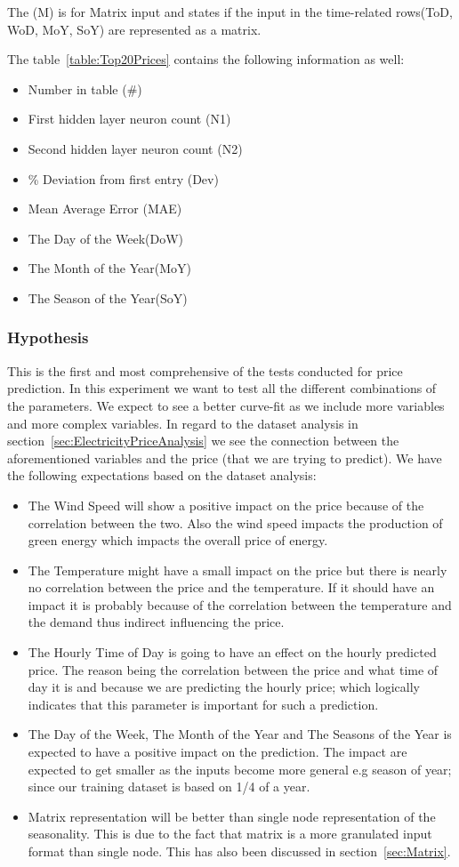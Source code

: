 The (M) is for Matrix input and states if the input in the time-related rows(ToD, WoD, MoY, SoY) are represented as a matrix.

The table~\ref{table:Top20Prices} contains the following information as well:
\begin{itemize}
	\item Number in table (\#)
	\item First hidden layer neuron count (N1)
	\item Second hidden layer neuron count (N2)
	\item \% Deviation from first entry (Dev)
	\item Mean Average Error (MAE)
	\item The Day of the Week(DoW)
	\item The Month of the Year(MoY)
	\item The Season of the Year(SoY)
\end{itemize}

\subsubsection{Hypothesis}
This is the first and most comprehensive of the tests conducted for price prediction. In this experiment we want to test all the different combinations of the parameters. We expect to see a better curve-fit as we include more variables and more complex variables. In regard to the dataset analysis in section~\ref{sec:ElectricityPriceAnalysis} we see the connection between the aforementioned variables and the price (that we are trying to predict). We have the following expectations based on the dataset analysis:
\begin{itemize}
	\item The Wind Speed will show a positive impact on the price because of the correlation between the two. Also the wind speed impacts the production of green energy which impacts the overall price of energy.
	\item The Temperature might have a small impact on the price but there is nearly no correlation between the price and the temperature. If it should have an impact it is probably because of the correlation between the temperature and the demand thus indirect influencing the price.
	\item The Hourly Time of Day is going to have an effect on the hourly predicted price. The reason being the correlation between the price and what time of day it is and because we are predicting the hourly price; which logically indicates that this parameter is important for such a prediction. 
	\item The Day of the Week, The Month of the Year and The Seasons of the Year is expected to have a positive impact on the prediction. The impact are expected to get smaller as the inputs become more general e.g season of year; since our training dataset is based on 1/4 of a year. 
	\item Matrix representation will be better than single node representation of the seasonality. This is due to the fact that matrix is a more granulated input format than single node. This has also been discussed in section~\ref{sec:Matrix}.
\end{itemize}

